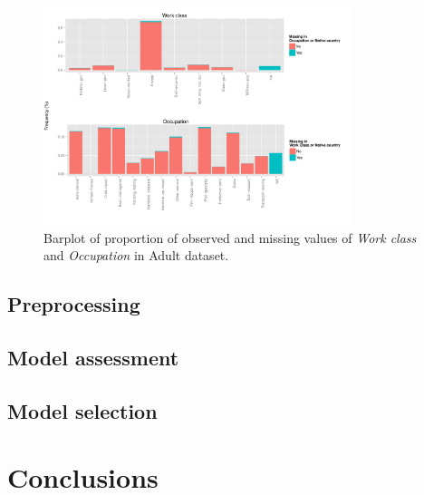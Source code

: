 \documentclass[10pt,twocolumn,letterpaper]{article}
\begin{document}
\begin{figure}[htbp] 
   \centering
   \includegraphics[width=0.8\textwidth]{./figure/barplot-missing.pdf}
   \caption{Barplot of proportion of observed and missing values of \textit{Work class} and \textit{Occupation} in Adult dataset.}
   \label{fig:barplot-missing}
\end{figure}

\subsection{Preprocessing}

\subsection{Model assessment}

\subsection{Model selection}

\section{Conclusions} \label{section:Con}


{\small


}
\end{document}
